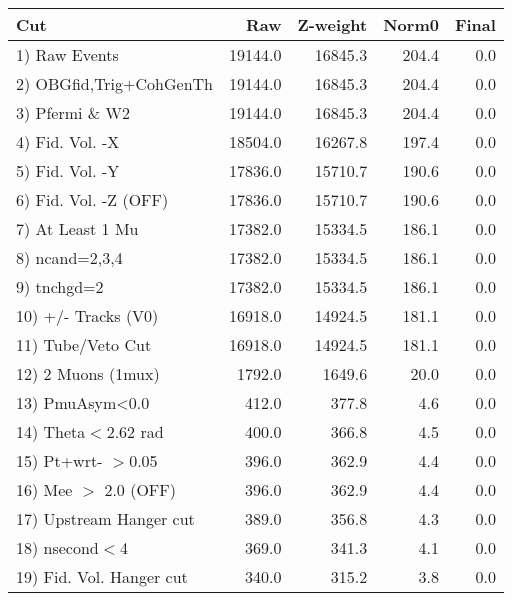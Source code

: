  \begin{table}[h!]\centering
 \begin{tabular}{||l||r|r|r|r||}
 \hline
 \hline
 Cut & Raw & Z-weight & Norm0 & Final \\
 \hline
  1) Raw Events           &     19144.0 &     16845.3 &       204.4 &         0.0 \\
  2) OBGfid,Trig+CohGenTh &     19144.0 &     16845.3 &       204.4 &         0.0 \\
  3) Pfermi \& W2         &     19144.0 &     16845.3 &       204.4 &         0.0 \\
  4) Fid. Vol. -X         &     18504.0 &     16267.8 &       197.4 &         0.0 \\
  5) Fid. Vol. -Y         &     17836.0 &     15710.7 &       190.6 &         0.0 \\
  6) Fid. Vol. -Z (OFF)   &     17836.0 &     15710.7 &       190.6 &         0.0 \\
  7) At Least 1 Mu        &     17382.0 &     15334.5 &       186.1 &         0.0 \\
  8) ncand=2,3,4          &     17382.0 &     15334.5 &       186.1 &         0.0 \\
  9) tnchgd=2             &     17382.0 &     15334.5 &       186.1 &         0.0 \\
 10) +/- Tracks (V0)      &     16918.0 &     14924.5 &       181.1 &         0.0 \\
 11) Tube/Veto Cut        &     16918.0 &     14924.5 &       181.1 &         0.0 \\
 12) 2 Muons (1mux)       &      1792.0 &      1649.6 &        20.0 &         0.0 \\
 13) PmuAsym<0.0          &       412.0 &       377.8 &         4.6 &         0.0 \\
 14) Theta$<$2.62 rad     &       400.0 &       366.8 &         4.5 &         0.0 \\
 15) Pt+wrt- $>$0.05      &       396.0 &       362.9 &         4.4 &         0.0 \\
 16) Mee $>$ 2.0  (OFF)   &       396.0 &       362.9 &         4.4 &         0.0 \\
 17) Upstream Hanger cut  &       389.0 &       356.8 &         4.3 &         0.0 \\
 18) nsecond$<$4          &       369.0 &       341.3 &         4.1 &         0.0 \\
 19) Fid. Vol. Hanger cut &       340.0 &       315.2 &         3.8 &         0.0 \\

\end{tabular}
\end{table}
